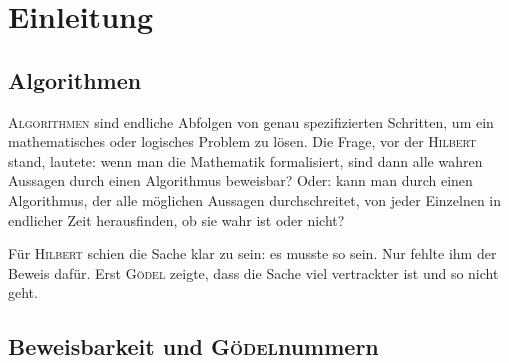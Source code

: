 \newpage

\section*{Einleitung}

\subsection*{Algorithmen}

\lettrine[nindent=0em]{\color{purple}A}{lgorithmen} sind endliche Abfolgen von
genau spezifizierten Schritten, um ein mathematisches oder logisches Problem zu lösen.
Die Frage, vor der \textsc{Hilbert} stand, lautete: wenn man die Mathematik formalisiert,
sind dann alle wahren Aussagen durch einen Algorithmus beweisbar? Oder: kann man durch
einen Algorithmus, der alle möglichen Aussagen durchschreitet, von jeder Einzelnen
in endlicher Zeit herausfinden, ob sie wahr ist oder nicht?

Für \textsc{Hilbert} schien die Sache klar zu sein: es musste so sein. Nur fehlte ihm der Beweis
dafür. Erst \textsc{Gödel} zeigte, dass die Sache viel vertrackter ist und so nicht geht.

\subsection*{Beweisbarkeit und \textsc{Gödel}nummern}

